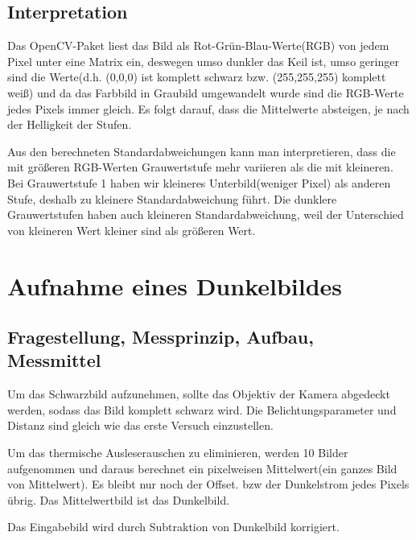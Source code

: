 \documentclass[12pt, oneside, a4paper, \docLanguage]{report}
\begin{document}
\section{Interpretation}
\label{chap:VERSUCH_1_INTERPRETATION}
Das OpenCV-Paket liest das Bild als Rot-Grün-Blau-Werte(RGB) von jedem Pixel unter eine Matrix ein, deswegen umso dunkler das Keil ist, umso geringer sind die Werte(d.h. (0,0,0) ist komplett schwarz bzw. (255,255,255) komplett weiß) und da das Farbbild in Graubild umgewandelt wurde sind die RGB-Werte jedes Pixels immer gleich. Es folgt darauf, dass die Mittelwerte absteigen, je nach der Helligkeit der Stufen.

Aus den berechneten Standardabweichungen kann man interpretieren, dass die mit größeren RGB-Werten Grauwertstufe mehr variieren als die mit kleineren. 
Bei Grauwertstufe 1 haben wir kleineres Unterbild(weniger Pixel) als anderen Stufe, deshalb zu kleinere Standardabweichung führt.  Die dunklere Grauwertstufen haben auch kleineren Standardabweichung, weil der Unterschied von kleineren Wert kleiner sind als größeren Wert.
%
%
\chapter{Aufnahme eines Dunkelbildes}
\section{Fragestellung, Messprinzip, Aufbau, Messmittel}
Um das Schwarzbild aufzunehmen, sollte das Objektiv der Kamera abgedeckt werden, sodass das Bild komplett schwarz wird. Die Belichtungsparameter und Distanz sind gleich wie das erste Versuch einzustellen.

Um das thermische Ausleserauschen zu eliminieren, werden 10 Bilder aufgenommen und daraus berechnet ein pixelweisen Mittelwert(ein ganzes Bild von Mittelwert). Es bleibt nur noch der Offset. bzw der Dunkelstrom jedes Pixels übrig. Das Mittelwertbild ist das Dunkelbild.

Das Eingabebild wird durch Subtraktion von Dunkelbild korrigiert.
\end{document}
